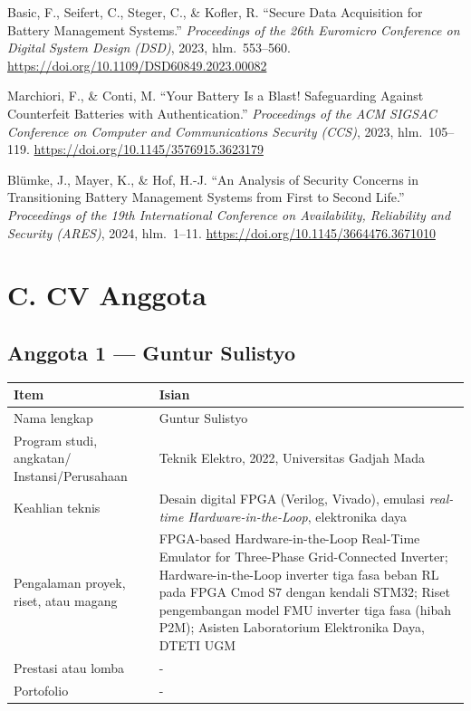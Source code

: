 \documentclass[11pt,a4paper]{article}
\newcommand{\hdr}[1]{\cellcolor{hdrgray}\textbf{#1}}
\begin{document}
\begin{enumerate}[label={[\arabic*]},ref={\arabic*}]
  \item\label{ref:dsd} Basic, F., Seifert, C., Steger, C., \& Kofler, R. ``Secure Data Acquisition for Battery Management Systems.'' \textit{Proceedings of the 26th Euromicro Conference on Digital System Design (DSD)}, 2023, hlm.~553--560. \url{https://doi.org/10.1109/DSD60849.2023.00082}
  \item\label{ref:ccs} Marchiori, F., \& Conti, M. ``Your Battery Is a Blast! Safeguarding Against Counterfeit Batteries with Authentication.'' \textit{Proceedings of the ACM SIGSAC Conference on Computer and Communications Security (CCS)}, 2023, hlm.~105--119. \url{https://doi.org/10.1145/3576915.3623179}
  \item\label{ref:blumke} Bl\"umke, J., Mayer, K., \& Hof, H.-J. ``An Analysis of Security Concerns in Transitioning Battery Management Systems from First to Second Life.'' \textit{Proceedings of the 19th International Conference on Availability, Reliability and Security (ARES)}, 2024, hlm.~1--11. \url{https://doi.org/10.1145/3664476.3671010}
\end{enumerate}

\newpage
\section{C. CV Anggota}

\subsection{Anggota 1 --- Guntur Sulistyo}

\begin{tabularx}{\linewidth}{|L{4.6cm}|Y|}
  \hline
  \hdr{Item} & \hdr{Isian} \\ \hline
  Nama lengkap & Guntur Sulistyo \\ \hline
  Program studi, angkatan/ Instansi/Perusahaan & Teknik Elektro, 2022, Universitas Gadjah Mada \\ \hline
  Keahlian teknis & Desain digital FPGA (Verilog, Vivado), emulasi \textit{real-time Hardware-in-the-Loop}, elektronika daya \\ \hline
  Pengalaman proyek, riset, atau magang & FPGA-based Hardware-in-the-Loop Real-Time Emulator for Three-Phase Grid-Connected Inverter; Hardware-in-the-Loop inverter tiga fasa beban RL pada FPGA Cmod S7 dengan kendali STM32; Riset pengembangan model FMU inverter tiga fasa (hibah P2M); Asisten Laboratorium Elektronika Daya, DTETI UGM \\ \hline
  Prestasi atau lomba & - \\ \hline
  Portofolio & - \\ \hline
\end{tabularx}
\end{document}
